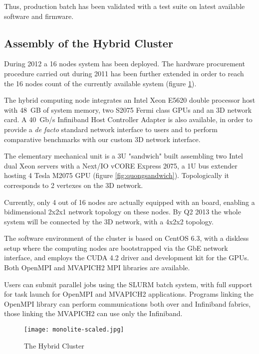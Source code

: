 Thus, production batch has been validated with a test suite on latest
available software and firmware.



\subsection{Assembly of the \quong Hybrid Cluster}

During 2012 a 16 nodes \quong system has been deployed.  The hardware
procurement procedure carried out during 2011 has been further
extended in order to reach the 16 nodes count of the currently
available system (figure \ref{fig:quong}).

The \quong hybrid computing node integrates an Intel Xeon E5620 double
processor host with 48~GB of system memory, two S2075 \nvidia Fermi
class GPUs and an \apenetp 3D network card.
A 40~Gb/s Infiniband Host Controller Adapter is also available, in
order to provide a \emph{de facto} standard network interface to users
and to perform comparative benchmarks with our custom 3D network
interface.

The \quong elementary mechanical unit is a 3U "sandwich" built
assembling two Intel dual Xeon servers with a Next/IO vCORE Express
2075, a 1U \PCIe bus extender hosting 4 \nvidia Tesla M2075 GPU (figure \ref{fig:quongsandwich}).
Topologically it corresponds to 2 vertexes on the \apenetp 3D network.

Currently, only 4 out of 16 nodes are actually equipped with an
\apenetp board, enabling a bidimensional 2x2x1 network topology on
these nodes.
By Q2 2013 the whole system will be connected by the \apenetp 3D
network, with a 4x2x2 topology.

The software environment of the cluster is based on CentOS 6.3, with a
diskless setup where the computing nodes are bootstrapped via the GbE
network interface, and employs the \nvidia CUDA 4.2 driver and
development kit for the GPUs. Both OpenMPI and MVAPICH2 MPI libraries
are available.

Users can submit parallel jobs using the SLURM batch system, with full
support for task launch for OpenMPI and MVAPICH2 applications. 
Programs linking  the OpenMPI library can perform communications both
over \apenetp and Infiniband fabrics, those linking the MVAPICH2 can 
use only the Infiniband.

\begin{figure}[!hbt]
  \centering
  \texttt{[image: monolite-scaled.jpg]}
  \caption{The \quong Hybrid Cluster}
  \label{fig:quong}
\end{figure}


